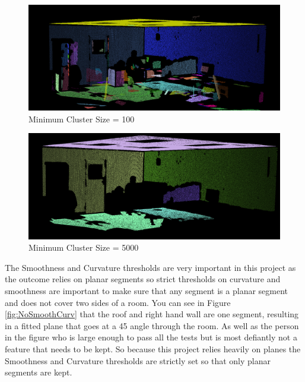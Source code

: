 		
		\begin{figure}[H]
			\centering
			\includegraphics[width=1\linewidth]{"Includes/images/RegionGrowing/min-size = 100"}
			\caption{Minimum Cluster Size = 100}
			\label{fig:min-size=100}
		\end{figure}
		
		\begin{figure}[H]
			\centering
			\includegraphics[width=1\linewidth]{"Includes/images/RegionGrowing/min-size = 5000"}
			\caption{Minimum Cluster Size = 5000}
			\label{fig:min-size=5000}
		\end{figure}
		
		The Smoothness and Curvature thresholds are very important in this project as the outcome relies on planar segments so strict thresholds on curvature and smoothness are important to make sure that any segment is a planar segment and does not cover two sides of a room. You can see in Figure \ref{fig:NoSmoothCurv} that the roof and right hand wall are one segment, resulting in a fitted plane that goes at a 45\textdegree\: angle through the room. As well as the person in the figure who is large enough to pass all the tests but is most defiantly not a feature that needs to be kept. So because this project relies heavily on planes the Smoothness and Curvature thresholds are strictly set so that only planar segments are kept.
		
